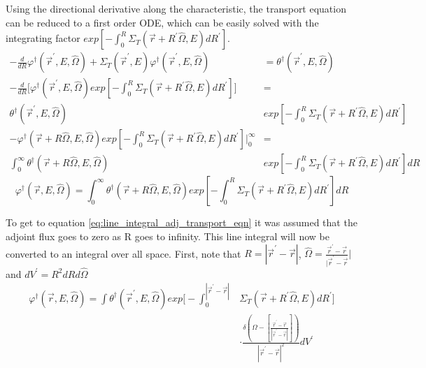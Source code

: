 Using the directional derivative along the characteristic, the transport 
equation can be reduced to a first order ODE, which can be easily solved with 
the integrating factor 
$exp\left[-\int_0^R \Sigma_T(\vec{r}+R^{'}\hat{\Omega},E)dR^{'} \right]$.
\begin{align}
  -\frac{d}{dR}\varphi^{\dagger}(\vec{r}^{'},E,\hat{\Omega}) + 
  \Sigma_T(\vec{r}^{'},E)
  \varphi^{\dagger}(\vec{r}^{'},E,\hat{\Omega}) & = 
  \theta^{\dagger}(\vec{r}^{'},E,\hat{\Omega}) \nonumber \\
  -\frac{d}{dR}\bigg[\varphi^{\dagger}(\vec{r}^{'},E,\hat{\Omega})
    exp\left[-\int_0^R \Sigma_T(\vec{r}+R^{'}\hat{\Omega},E)dR^{'}\right]
    \bigg] & = \nonumber \\
  \theta^{\dagger}(\vec{r}^{'},E,\hat{\Omega})
  &exp\left[-\int_0^R \Sigma_T(\vec{r}+R^{'}\hat{\Omega},E)dR^{'} \right] 
  \nonumber \\
  -\varphi^{\dagger}(\vec{r} + R\hat{\Omega},E,\hat{\Omega})
  exp\left[-\int_0^R \Sigma_T(\vec{r}+R^{'}\hat{\Omega},E)dR^{'}\right] 
  \bigg|_0^{\infty} & = \nonumber \\
  \int_0^{\infty} 
  \theta^{\dagger}(\vec{r} + R\hat{\Omega},E,\hat{\Omega})
  &exp\left[-\int_0^R \Sigma_T(\vec{r}+R^{'}\hat{\Omega},E)dR^{'} \right] dR
  \nonumber 
\end{align}
\begin{equation}
    \varphi^{\dagger}(\vec{r},E,\hat{\Omega}) = 
    \int_0^{\infty} \theta^{\dagger}(\vec{r} + R\hat{\Omega},E,\hat{\Omega})
    exp\left[-\int_0^R \Sigma_T(\vec{r}+R^{'}\hat{\Omega},E)dR^{'} \right] dR
  \label{eq:line_integral_adj_transport_eqn}
\end{equation}

To get to equation \ref{eq:line_integral_adj_transport_eqn} it was assumed that
the adjoint flux goes to zero as R goes to infinity. This line integral will
now be converted to an integral over all space. First, note that 
$R = |\vec{r}^{'} - \vec{r}|$,
$\hat{\Omega} = \frac{\vec{r}^{'} - \vec{r}}{|\vec{r}^{'} - \vec{r}}|$ and
$dV^{'} = R^2dRd\hat{\Omega}$
\begin{equation}
  \begin{split}
    \varphi^{\dagger}(\vec{r},E,\hat{\Omega}) = 
    \int \theta^{\dagger}(\vec{r}^{'},E,\hat{\Omega})
    exp\Big[-\int_0^{|\vec{r}^{'} - \vec{r}|} 
      &\Sigma_T(\vec{r}+R^{'}\hat{\Omega},E)dR^{'} \Big] \\
    &\cdot \frac{\delta \left(\Omega - \left[\frac{\vec{r}^{'} - \vec{r}}
        {|\vec{r}^{'} - \vec{r}|}\right]\right)}
    {|\vec{r}^{'} - \vec{r}|^2} dV^{'}
  \end{split}
  \label{eq:volume_integral_adj_transport_eqn}
\end{equation}

